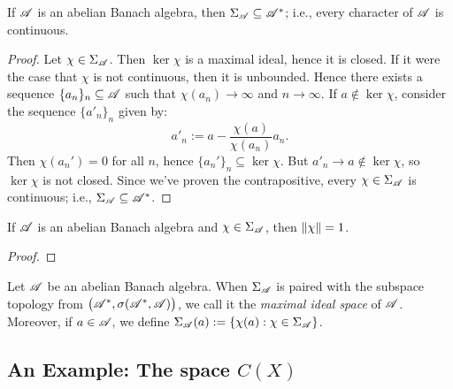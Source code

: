 \begin{corollary}
	If $\mathscr{A}$ is an abelian Banach algebra, then $\Sigma_{\mathscr{A}} \subseteq \mathscr{A}^\ast$; i.e., every character of $\mathscr{A}$ is continuous.
\end{corollary}
	\begin{proof}
		Let $\chi \in \Sigma_{\mathscr{A}}$. Then $\ker \chi$ is a maximal ideal, hence it is closed. If it were the case that $\chi$ is not continuous, then it is unbounded. Hence there exists a sequence $\{a_n\}_n \subseteq \mathscr{A}$ such that $\chi(a_n) \rightarrow \infty$ and $n \rightarrow \infty$. If $a \not\in \ker \chi$, consider the sequence $\{a'_n\}_n$ given by:
		\[
			a'_n := a- \frac{\chi(a)}{\chi(a_n)}a_n.
		\] 
		Then $\chi(a_n') = 0$ for all $n$, hence $\{a_n'\}_n \subseteq \ker\chi$. But $a'_n \rightarrow a \not\in \ker \chi$, so $\ker \chi$ is not closed. Since we've proven the contrapositive, every $\chi \in \Sigma_{\mathscr{A}}$ is continuous; i.e., $\Sigma_{\mathscr{A}} \subseteq \mathscr{A}^\ast$.
	\end{proof}

\begin{corollary}
	If $\mathscr{A}$ is an abelian Banach algebra and $\chi \in \Sigma_{\mathscr{A}}$, then $\left\lVert \chi \right\rVert= 1$.
\end{corollary}
	{\color{red}
	\begin{proof}
			
	\end{proof}}

\begin{definition}
	Let $\mathscr{A}$ be an abelian Banach algebra. When $\Sigma_{\mathscr{A}}$ is paired with the subspace topology from $\bigl( \mathscr{A}^\ast, \sigma(\mathscr{A}^\ast,\mathscr{A}) \bigr)$, we call it the \emph{maximal ideal space} of $\mathscr{A}$. Moreover, if $a \in \mathscr{A}$, we define $\Sigma_{\mathscr{A}}(a) := \{\chi(a) : \chi \in \Sigma_{\mathscr{A}}\}$.
\end{definition}

\subsection{An Example: The space $C(X)$}


